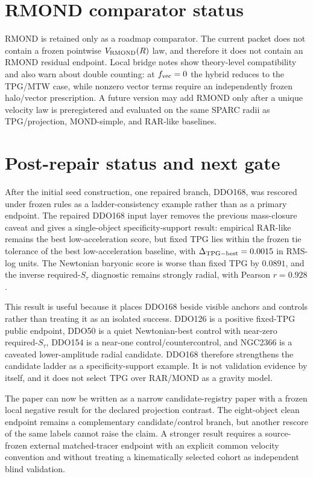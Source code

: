 \documentclass[11pt]{article}
\begin{document}
\section{RMOND comparator status}

RMOND is retained only as a roadmap comparator. The current packet does not contain a frozen pointwise $V_{\rm RMOND}(R)$ law, and therefore it does not contain an RMOND residual endpoint. Local bridge notes show theory-level compatibility and also warn about double counting: at $f_{\rm vec}=0$ the hybrid reduces to the TPG/MTW case, while nonzero vector terms require an independently frozen halo/vector prescription. A future version may add RMOND only after a unique velocity law is preregistered and evaluated on the same SPARC radii as TPG/projection, MOND-simple, and RAR-like baselines.

\section{Post-repair status and next gate}

After the initial seed construction, one repaired branch, DDO168, was rescored under frozen rules as a ladder-consistency example rather than as a primary endpoint. The repaired DDO168 input layer removes the previous mass-closure caveat and gives a single-object specificity-support result: empirical RAR-like remains the best low-acceleration score, but fixed TPG lies within the frozen tie tolerance of the best low-acceleration baseline, with $\Delta_{{\rm TPG-best}}=0.0015$ in RMS-log units. The Newtonian baryonic score is worse than fixed TPG by $0.0891$, and the inverse required-$S_\tau$ diagnostic remains strongly radial, with Pearson $r=0.928$.

This result is useful because it places DDO168 beside visible anchors and controls rather than treating it as an isolated success. DDO126 is a positive fixed-TPG public endpoint, DDO50 is a quiet Newtonian-best control with near-zero required-$S_\tau$, DDO154 is a near-one control/\allowbreak countercontrol, and NGC2366 is a caveated lower-amplitude radial candidate. DDO168 therefore strengthens the candidate ladder as a specificity-support example. It is not validation evidence by itself, and it does not select TPG over RAR/MOND as a gravity model.

The paper can now be written as a narrow candidate-registry paper with a frozen local negative result for the declared projection contrast. The eight-object clean endpoint remains a complementary candidate/control branch, but another rescore of the same labels cannot raise the claim. A stronger result requires a source-frozen external matched-tracer endpoint with an explicit common velocity convention and without treating a kinematically selected cohort as independent blind validation.
\end{document}
